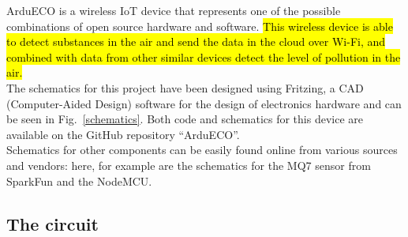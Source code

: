 \documentclass[conference]{IEEEtran}
\DeclareRobustCommand{\hlcyan}[1]{{\sethlcolor{cyan}\hl{#1}}}
\begin{document}
	ArduECO is a wireless IoT device that represents one of the possible combinations of open source hardware and software.
	\hlcyan{This wireless device is able to detect substances in the air and send the data in the cloud over Wi-Fi, and combined with data from other similar devices detect the level of pollution in the air.}\\
	The schematics for this project have been designed using Fritzing, a CAD (Computer-Aided Design) software for the design of electronics hardware\cite{fritzing} and can be seen in Fig.~\ref{schematics}.
	Both code and schematics for this device are available on the GitHub repository ``ArduECO''\cite{ardueco_git}.\\
	Schematics for other components can be easily found online from various sources and vendors: here, for example are the schematics for the MQ7 sensor from SparkFun\cite{spark_mq} and the NodeMCU\cite{node_scheme}.
	
	\subsection{The circuit}\label{circuit}
	
\end{document}
